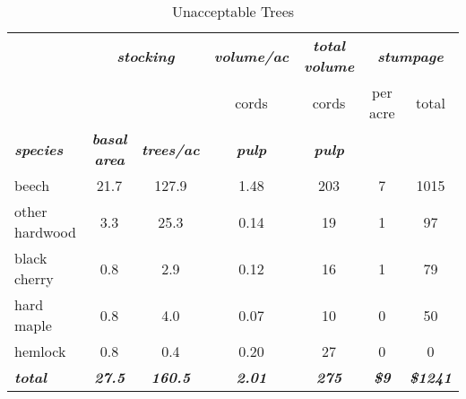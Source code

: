 \documentclass[landscape]{article}
\begin{document}
\begin{table}[H]

\caption{\label{tab:unnamed-chunk-22}Unacceptable Trees}
\fontsize{10}{12}\selectfont
\begin{tabular}[t]{lcccccc}
\toprule
\multicolumn{1}{c}{\em{\textbf{ }}} & \multicolumn{2}{c}{\em{\textbf{stocking}}} & \multicolumn{1}{c}{\em{\textbf{volume/ac }}} & \multicolumn{1}{c}{\em{\textbf{total volume}}} & \multicolumn{2}{c}{\em{\textbf{stumpage}}} \\
\cmidrule(l{3pt}r{3pt}){2-3} \cmidrule(l{3pt}r{3pt}){4-4} \cmidrule(l{3pt}r{3pt}){5-5} \cmidrule(l{3pt}r{3pt}){6-7}
\multicolumn{3}{c}{ } & \multicolumn{1}{c}{cords} & \multicolumn{1}{c}{cords} & \multicolumn{1}{c}{per acre} & \multicolumn{1}{c}{total} \\
\cmidrule(l{3pt}r{3pt}){4-4} \cmidrule(l{3pt}r{3pt}){5-5} \cmidrule(l{3pt}r{3pt}){6-6} \cmidrule(l{3pt}r{3pt}){7-7}
\rowcolor[HTML]{DCDCDC}  \em{\textbf{species}} & \em{\textbf{basal area}} & \em{\textbf{trees/ac}} & \em{\textbf{pulp}} & \em{\textbf{pulp}} & \em{\textbf{ }} & \em{\textbf{ }}\\
\midrule
\rowcolor{gray!6}  beech & 21.7 & 127.9 & 1.48 & 203 & 7 & 1015\\
 
other hardwood & 3.3 & 25.3 & 0.14 & 19 & 1 & 97\\
 
\rowcolor{gray!6}  black cherry & 0.8 & 2.9 & 0.12 & 16 & 1 & 79\\
 
hard maple & 0.8 & 4.0 & 0.07 & 10 & 0 & 50\\
 
\rowcolor{gray!6}  hemlock & 0.8 & 0.4 & 0.20 & 27 & 0 & 0\\
 
\rowcolor[HTML]{DCDCDC}  \em{\textbf{total}} & \em{\textbf{27.5}} & \em{\textbf{160.5}} & \em{\textbf{2.01}} & \em{\textbf{275}} & \em{\textbf{\$9}} & \em{\textbf{\$1241}}\\
\bottomrule
\end{tabular}
\end{table}
\end{document}
